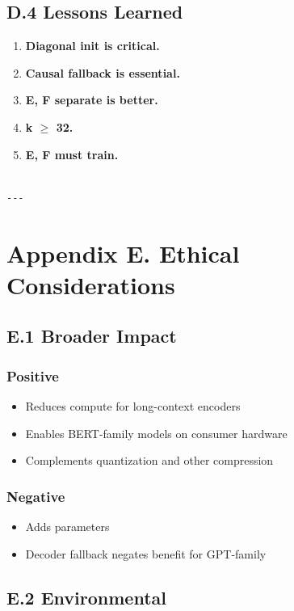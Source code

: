 \subsection{D.4 Lessons Learned}

\begin{enumerate}
\item \textbf{Diagonal init is critical.}
\item \textbf{Causal fallback is essential.}
\item \textbf{E, F separate is better.}
\item \textbf{k $\ge$ 32.}
\item \textbf{E, F must train.}
\end{enumerate}
\begin{lstlisting}

---
\end{lstlisting}

\section{Appendix E. Ethical Considerations}

\subsection{E.1 Broader Impact}

\subsubsection{Positive}
\begin{itemize}
\item Reduces compute for long-context encoders
\item Enables BERT-family models on consumer hardware
\item Complements quantization and other compression

\end{itemize}
\subsubsection{Negative}
\begin{itemize}
\item Adds parameters
\item Decoder fallback negates benefit for GPT-family

\end{itemize}
\subsection{E.2 Environmental}

